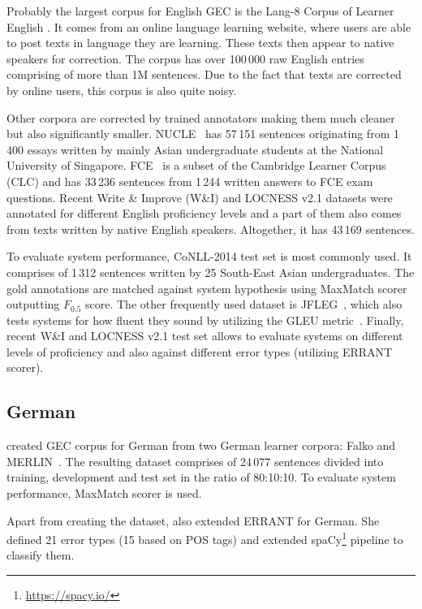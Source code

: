 \documentclass[11pt,a4paper]{article}
\begin{document}
Probably the largest corpus for English GEC is the Lang-8 Corpus of Learner English \citep{mizumoto2011mining, tajiri2012tense}. It comes from an online language learning website, where users are able to post texts in language they are learning. These texts then appear to native speakers for correction. The corpus has over 100\,000 raw English entries comprising of more than 1M sentences. Due to the fact that texts are corrected by online users, this corpus is also quite noisy.

Other corpora are corrected by trained annotators making them much cleaner but also significantly smaller. NUCLE~\cite{dahlmeier2013building} has 57\,151 sentences originating from 1\,400 essays written by mainly Asian undergraduate students at the National University of Singapore. FCE~\cite{yannakoudakis2011new} is a subset of the Cambridge Learner
Corpus (CLC) and has 33\,236 sentences from 1\,244 written answers to FCE exam questions. Recent Write \& Improve (W\&I) and LOCNESS v2.1 \citep{bryant2019bea, granger1998} datasets were annotated for different English proficiency levels and a part of them also comes from texts written by native English speakers. Altogether, it has 43\,169 sentences.

To evaluate system performance, CoNLL-2014 test set is most commonly used. It comprises of 1\,312 sentences written by 25 South-East Asian undergraduates. The gold annotations are matched against system hypothesis using MaxMatch scorer outputting $F_{0.5}$ score. The other frequently used dataset is JFLEG~\cite{napoles-sakaguchi-tetreault:2017:EACLshort, heilman-EtAl:2014:P14-2}, which also tests systems for how fluent they sound by utilizing the GLEU metric~\cite{napoles2015ground}. Finally, recent W\&I and LOCNESS v2.1 test set allows to evaluate systems on different levels of proficiency and also against different error types (utilizing ERRANT scorer).

\subsection{German}

 created GEC corpus for German from two German learner corpora: Falko and MERLIN~\cite{boyd2014merlin}. The resulting dataset comprises of 24\,077 sentences divided into training, development and test set in the ratio of 80:10:10. To evaluate system performance, MaxMatch scorer is used.

Apart from creating the dataset,  also extended ERRANT for German. She defined 21 error types (15 based on POS tags) and extended spaCy\footnote{\scriptsize\url{https://spacy.io/}} pipeline to classify them.
\end{document}
